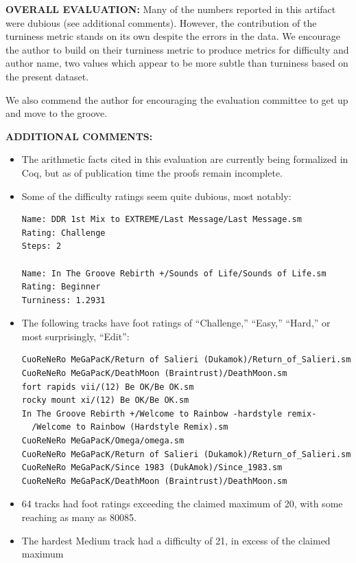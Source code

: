 \documentclass[12pt]{article}
\begin{document}
\textbf{OVERALL EVALUATION:}
 Many of the numbers reported in this artifact were dubious (see
 additional comments). However, the contribution of the turniness metric stands on its own despite
 the errors in the data. We encourage the author to build on their turniness metric to produce metrics
 for difficulty and author name, two values which appear to be more subtle than turniness based on
 the present dataset.

 We also commend the author for encouraging the evaluation committee to get up and move to the
 groove.

\textbf{ADDITIONAL COMMENTS:}
\begin{itemize}
\item The arithmetic facts cited in this evaluation are currently being formalized in Coq, but as of
publication time the proofs remain incomplete.

\item Some of the difficulty ratings seem quite dubious, most notably:

\begin{verbatim}
Name: DDR 1st Mix to EXTREME/Last Message/Last Message.sm
Rating: Challenge
Steps: 2

Name: In The Groove Rebirth +/Sounds of Life/Sounds of Life.sm
Rating: Beginner
Turniness: 1.2931
\end{verbatim}

\item The following tracks have foot ratings of ``Challenge,'' ``Easy,'' ``Hard,'' or most surprisingly,
``Edit'':

\begin{verbatim}
CuoReNeRo MeGaPacK/Return of Salieri (Dukamok)/Return_of_Salieri.sm
CuoReNeRo MeGaPacK/DeathMoon (Braintrust)/DeathMoon.sm
fort rapids vii/(12) Be OK/Be OK.sm
rocky mount xi/(12) Be OK/Be OK.sm
In The Groove Rebirth +/Welcome to Rainbow -hardstyle remix-
  /Welcome to Rainbow (Hardstyle Remix).sm
CuoReNeRo MeGaPacK/Omega/omega.sm
CuoReNeRo MeGaPacK/Return of Salieri (Dukamok)/Return_of_Salieri.sm
CuoReNeRo MeGaPacK/Since 1983 (DukAmok)/Since_1983.sm
CuoReNeRo MeGaPacK/DeathMoon (Braintrust)/DeathMoon.sm
\end{verbatim}

\item 64 tracks had foot ratings exceeding the claimed maximum of 20, with some reaching as
many as 80085.

\item The hardest Medium track had a difficulty of 21, in excess of the claimed maximum


\end{itemize}
\end{document}
